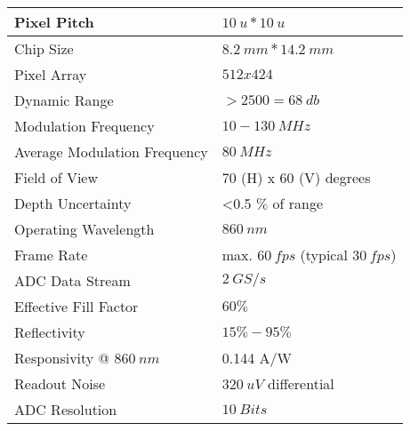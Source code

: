 	\begin{center}
    \begin{tabular}{| l | l |}
    	\hline
    	Pixel Pitch & $10~u*10~u$  \\ \hline
    	Chip Size & $8.2~mm*14.2~mm$  \\ \hline
    	Pixel Array & $512 x 424$  \\ \hline
    	Dynamic Range & $>2500=68~db$  \\ \hline
    	Modulation Frequency & $10-130~MHz $ \\ \hline
    	Average Modulation Frequency & $80~MHz$ \\ \hline
    	Field of View &  70 (H) x 60 (V) degrees  \\ \hline
    	Depth Uncertainty & <0.5 $\%$ of range \\ \hline
    	Operating Wavelength & $860~nm$ \\ \hline
    	Frame Rate &  max. $60~fps$ (typical $30~fps$) \\ \hline
    	ADC Data Stream & $2~GS/s$ \\ \hline
    	Effective Fill Factor & $60\%$ \\ \hline
    	Reflectivity &	$15\%-95\%$ \\ \hline
    	Responsivity @ $860~nm$ & 0.144 A/W  \\ \hline 
    	Readout Noise	& $320~uV$ differential \\ \hline 
    	ADC Resolution & $10~Bits$ \\ 
    	\hline 
    \end{tabular} 	
\end{center}
\newpage

